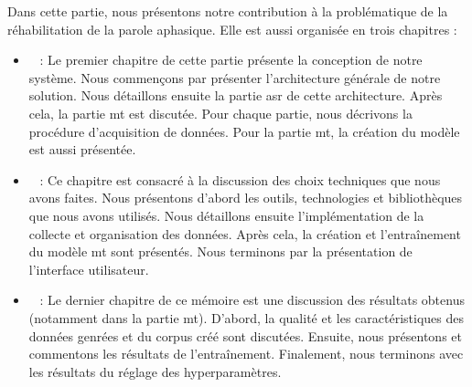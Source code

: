 Dans cette partie, nous présentons notre contribution à la problématique de la réhabilitation de la parole aphasique.
Elle est aussi organisée en trois chapitres :
\begin{itemize}
    \item {}~ :
    Le premier chapitre de cette partie présente la conception de notre système.
    Nous commençons par présenter l'architecture générale de notre solution.
    Nous détaillons ensuite la partie \gls{asr} de cette architecture.
    Après cela, la partie \gls{mt} est discutée.
    Pour chaque partie, nous décrivons la procédure d'acquisition de données. 
    Pour la partie \gls{mt}, la création du modèle est aussi présentée.
    
    \item {}~ :
    Ce chapitre est consacré à la discussion des choix techniques que nous avons faites.
    Nous présentons d'abord les outils, technologies et bibliothèques que nous avons utilisés.
    Nous détaillons ensuite l'implémentation de la collecte et organisation des données.
    Après cela, la création et l'entraînement du modèle \gls{mt} sont présentés.
    Nous terminons par la présentation de l'interface utilisateur.
    
    \item {}~ :
    Le dernier chapitre de ce mémoire est une discussion des résultats obtenus 
    (notamment dans la partie \gls{mt}).
    D'abord, la qualité et les caractéristiques des données genrées et du corpus créé sont discutées.
    Ensuite, nous présentons et commentons les résultats de l'entraînement.
    Finalement, nous terminons avec les résultats du réglage des hyperparamètres.
\end{itemize}

